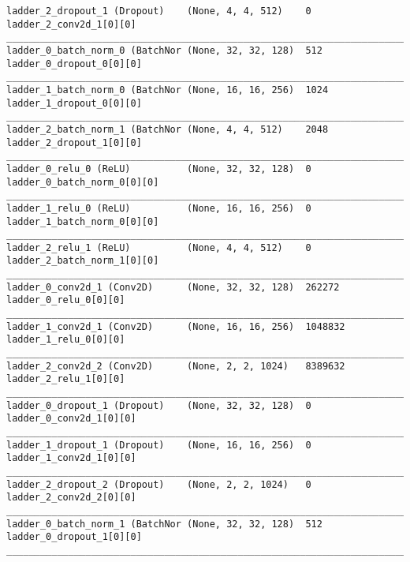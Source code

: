 \begin{lstlisting}[caption={dSprites-VLAE Encoder},captionpos=b,basicstyle=\tiny, label={lst:dsprites-vlae-encoder}]
ladder_2_dropout_1 (Dropout)    (None, 4, 4, 512)    0           ladder_2_conv2d_1[0][0]
__________________________________________________________________________________________________
ladder_0_batch_norm_0 (BatchNor (None, 32, 32, 128)  512         ladder_0_dropout_0[0][0]
__________________________________________________________________________________________________
ladder_1_batch_norm_0 (BatchNor (None, 16, 16, 256)  1024        ladder_1_dropout_0[0][0]
__________________________________________________________________________________________________
ladder_2_batch_norm_1 (BatchNor (None, 4, 4, 512)    2048        ladder_2_dropout_1[0][0]
__________________________________________________________________________________________________
ladder_0_relu_0 (ReLU)          (None, 32, 32, 128)  0           ladder_0_batch_norm_0[0][0]
__________________________________________________________________________________________________
ladder_1_relu_0 (ReLU)          (None, 16, 16, 256)  0           ladder_1_batch_norm_0[0][0]
__________________________________________________________________________________________________
ladder_2_relu_1 (ReLU)          (None, 4, 4, 512)    0           ladder_2_batch_norm_1[0][0]
__________________________________________________________________________________________________
ladder_0_conv2d_1 (Conv2D)      (None, 32, 32, 128)  262272      ladder_0_relu_0[0][0]
__________________________________________________________________________________________________
ladder_1_conv2d_1 (Conv2D)      (None, 16, 16, 256)  1048832     ladder_1_relu_0[0][0]
__________________________________________________________________________________________________
ladder_2_conv2d_2 (Conv2D)      (None, 2, 2, 1024)   8389632     ladder_2_relu_1[0][0]
__________________________________________________________________________________________________
ladder_0_dropout_1 (Dropout)    (None, 32, 32, 128)  0           ladder_0_conv2d_1[0][0]
__________________________________________________________________________________________________
ladder_1_dropout_1 (Dropout)    (None, 16, 16, 256)  0           ladder_1_conv2d_1[0][0]
__________________________________________________________________________________________________
ladder_2_dropout_2 (Dropout)    (None, 2, 2, 1024)   0           ladder_2_conv2d_2[0][0]
__________________________________________________________________________________________________
ladder_0_batch_norm_1 (BatchNor (None, 32, 32, 128)  512         ladder_0_dropout_1[0][0]
__________________________________________________________________________________________________

\end{lstlisting}
